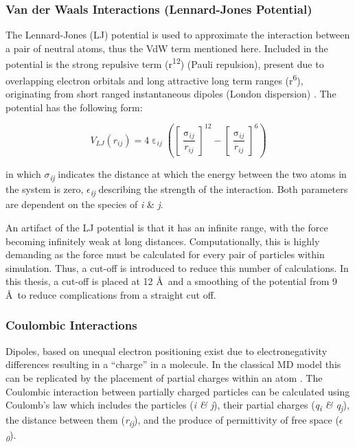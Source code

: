 \subsubsection{Van der Waals Interactions (Lennard-Jones Potential)}

The Lennard-Jones (LJ) potential is used to approximate the interaction between a pair of neutral atoms, thus the VdW term mentioned here. Included in the potential is the strong repulsive term (r\textsuperscript{12}) (Pauli repulsion), present due to overlapping electron orbitals and long attractive long term ranges (r\textsuperscript{6}), originating from short ranged instantaneous dipoles (London dispersion) \cite{Leach2001}. The potential has the following form:

\begin{equation}
V_{LJ} (r_{ij}) = 4 \upepsilon_{ij} \left( \left[ \frac{\upsigma_{ij}}{r_{ij}} \right]^{12} - \left[ \frac{\upsigma_{ij}}{r_{ij}} \right]^6 \right)
\label{eq:LJ}
\end{equation}

in which \textit{$\sigma$\textsubscript{ij}} indicates the distance at which the energy between the two atoms in the system is zero, \textit{$\epsilon$\textsubscript{ij}} describing the strength of the interaction. Both parameters are dependent on the species of \textit{i} \& \textit{j}.

An artifact of the LJ potential is that it has an infinite range, with the force becoming infinitely weak at long distances. Computationally, this is highly demanding as the force must be calculated for every pair of particles within simulation. Thus, a cut-off is introduced to reduce this number of calculations. In this thesis, a cut-off is placed at 12 \AA\ and a smoothing of the potential from 9 \AA\ to reduce complications from a straight cut off. 

\subsubsection{Coulombic Interactions}

Dipoles, based on unequal electron positioning exist due to electronegativity differences resulting in a ``charge'' in a molecule. In the classical MD model this can be replicated by the placement of partial charges within an atom \cite{Apol2013}. The Coulombic interaction between partially charged particles can be calculated using Coulomb's law which includes the particles (\textit{i \& j}), their partial charges (\textit{q\textsubscript{i} \& q\textsubscript{j}}), the distance between them (\textit{r\textsubscript{ij}}), and the produce of permittivity of free space (\textit{$\epsilon$\textsubscript{0}}).

